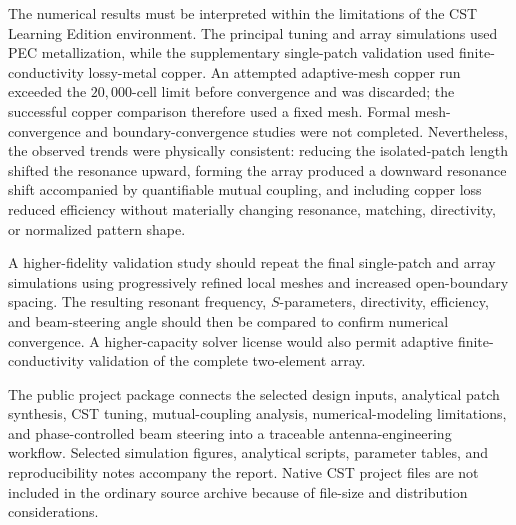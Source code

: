 The numerical results must be interpreted within the limitations of the CST Learning Edition
environment. The principal tuning and array simulations used PEC metallization, while the
supplementary single-patch validation used finite-conductivity lossy-metal copper. An attempted
adaptive-mesh copper run exceeded the \(20{,}000\)-cell limit before convergence and was discarded;
the successful copper comparison therefore used a fixed mesh. Formal mesh-convergence and
boundary-convergence studies were not completed. Nevertheless, the observed trends were physically
consistent: reducing the isolated-patch length shifted the resonance upward, forming the array
produced a downward resonance shift accompanied by quantifiable mutual coupling, and including
copper loss reduced efficiency without materially changing resonance, matching, directivity, or
normalized pattern shape.

A higher-fidelity validation study should repeat the final single-patch and array simulations using
progressively refined local meshes and increased open-boundary spacing. The resulting resonant
frequency, \(S\)-parameters, directivity, efficiency, and beam-steering angle should then be compared
to confirm numerical convergence. A higher-capacity solver license would also permit adaptive
finite-conductivity validation of the complete two-element array.

The public project package connects the selected design inputs, analytical patch synthesis, CST
tuning, mutual-coupling analysis, numerical-modeling limitations, and phase-controlled beam
steering into a traceable antenna-engineering workflow. Selected simulation figures, analytical
scripts, parameter tables, and reproducibility notes accompany the report. Native CST project files
are not included in the ordinary source archive because of file-size and distribution considerations.
